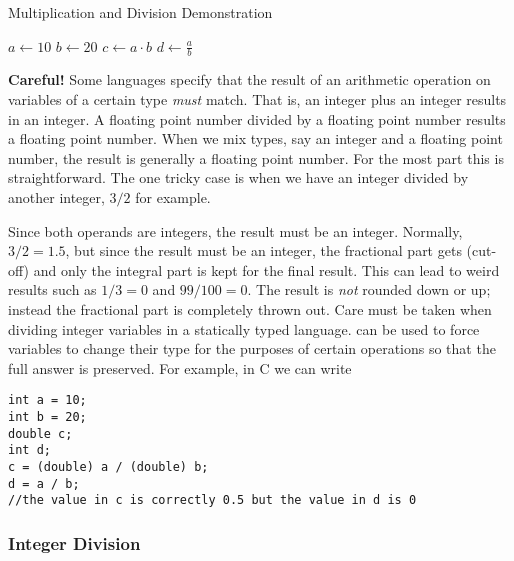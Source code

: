 \begin{algorithm}[H]
\caption{Multiplication and Division Demonstration}
\label{algo:multiplicationDivisionOperators}
$a \leftarrow 10$ \;
$b \leftarrow 20$ \;
$c \leftarrow a \cdot b$ \;
$d \leftarrow \frac{a}{b}$ \;
\end{algorithm}

{\color{red} \textbf{Careful!}} Some languages specify that the result of an arithmetic
operation on variables of a certain type \emph{must} match.  That is, an 
integer plus an integer results in an integer.  A 
floating point number divided
by a 
floating point number results a 
floating point number.  When we mix types, 
say an integer and a 
floating point number, the result is generally a 
floating point
number.  For the most part this is straightforward.  The one tricky case is
when we have an integer divided by another integer, $3 / 2$ for example.  

Since both operands are integers, the result must be an integer.  Normally,
$3 / 2 = 1.5$, but since the result must be an integer, the fractional part
gets   (cut-off) and only the integral part is kept for the final
result.  This can lead to weird results such as $1 / 3 = 0$ and $99 / 100 = 0$.
The result is \emph{not} rounded down or up; instead the fractional part
is completely thrown out.  Care must be taken when dividing integer variables
in a statically typed language.    can be
used to force variables to change their type for the purposes of certain
operations so that the full answer is preserved.  For example, in C we can
write

\begin{verbatim}
int a = 10;
int b = 20;
double c;
int d;
c = (double) a / (double) b;
d = a / b;
//the value in c is correctly 0.5 but the value in d is 0
\end{verbatim}

\subsubsection{Integer Division}

